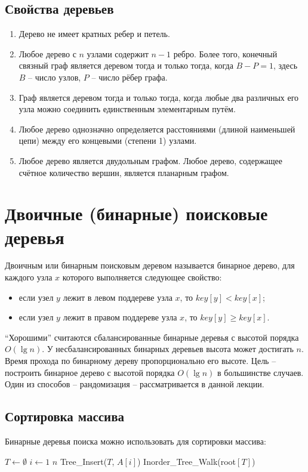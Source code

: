 \documentclass[11pt]{article}
\begin{document}
\subsection{Свойства деревьев}
\begin{enumerate}
\item Дерево не имеет кратных ребер и петель.
\item Любое дерево с $n$ узлами содержит $n-1$ ребро. Более того, конечный
  связный граф является деревом тогда и только тогда, когда $B-P = 1$,
  здесь $B$ -- число узлов, $P$ -- число рёбер графа.
\item Граф является деревом тогда и только тогда, когда любые два различных его
  узла можно соединить единственным элементарным путём.
\item Любое дерево однозначно определяется расстояниями (длиной наименьшей
  цепи) между его концевыми (степени 1) узлами.
\item Любое дерево является двудольным графом. Любое дерево, содержащее счётное
  количество вершин, является планарным графом.
\end{enumerate}

\section{Двоичные (бинарные) поисковые деревья}
Двоичным или бинарным поисковым деревом называется бинарное дерево, для
каждого узла $x$ которого выполняется следующее свойство:
\begin{itemize}
\item если узел $y$ лежит в левом поддереве узла $x$, то 
  $key[y] < key[x]$;
\item если узел $y$ лежит в правом поддереве узла $x$, то
  $key[y] \geqslant key[x]$.
\end{itemize}

``Хорошими'' считаются сбалансированные бинарные деревья с высотой
порядка $O(\lg n)$. У несбалансированных бинарных деревьев высота может
достигать $n$. Время прохода по бинарному дереву пропорционально его высоте.
Цель -- построить бинарное дерево с высотой порядка $O(\lg n)$ в большинстве
случаев. Один из способов -- рандомизация -- рассматривается в данной лекции.

\subsection{Сортировка массива}
Бинарные деревья поиска можно использовать для сортировки массива:
\begin{codebox}
\li $T \gets \emptyset $
\li \For $i \gets 1$ \To $n$
\li \Do Tree\_Insert($T$, $A[i]$)
  \End
\li Inorder\_Tree\_Walk(root$[T]$)
\end{codebox}
\end{document}
